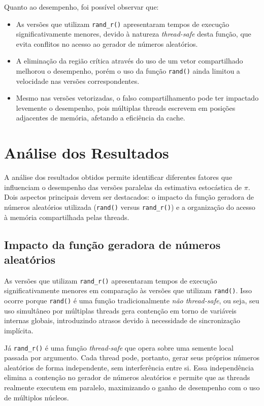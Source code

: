 \documentclass[a4paper, 12pt]{article}
\begin{document}
	Quanto ao desempenho, foi possível observar que:
	
	\begin{itemize}
		\item As versões que utilizam \texttt{rand\_r()} apresentaram tempos de execução significativamente menores, devido à natureza \textit{thread-safe} desta função, que evita conflitos no acesso ao gerador de números aleatórios.
		\item A eliminação da região crítica através do uso de um vetor compartilhado melhorou o desempenho, porém o uso da função \texttt{rand()} ainda limitou a velocidade nas versões correspondentes.
		\item Mesmo nas versões vetorizadas, o falso compartilhamento pode ter impactado levemente o desempenho, pois múltiplas threads escrevem em posições adjacentes de memória, afetando a eficiência da cache.
	\end{itemize}
	
	\section{Análise dos Resultados}
	
	A análise dos resultados obtidos permite identificar diferentes fatores que influenciam o desempenho das versões paralelas da estimativa estocástica de $\pi$. Dois aspectos principais devem ser destacados: o impacto da função geradora de números aleatórios utilizada (\texttt{rand()} versus \texttt{rand\_r()}) e a organização do acesso à memória compartilhada pelas threads.
	
	\subsection{Impacto da função geradora de números aleatórios}
	
	As versões que utilizam \texttt{rand\_r()} apresentaram tempos de execução significativamente menores em comparação às versões que utilizam \texttt{rand()}. Isso ocorre porque \texttt{rand()} é uma função tradicionalmente \textit{não thread-safe}, ou seja, seu uso simultâneo por múltiplas threads gera contenção em torno de variáveis internas globais, introduzindo atrasos devido à necessidade de sincronização implícita.
	
	Já \texttt{rand\_r()} é uma função \textit{thread-safe} que opera sobre uma semente local passada por argumento. Cada thread pode, portanto, gerar seus próprios números aleatórios de forma independente, sem interferência entre si. Essa independência elimina a contenção no gerador de números aleatórios e permite que as threads realmente executem em paralelo, maximizando o ganho de desempenho com o uso de múltiplos núcleos.
	
\end{document}
